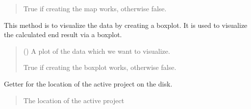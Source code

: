 \documentclass[letterpaper,10pt,english]{sphinxmanual}
\begin{document}
\begin{fulllineitems}
\begin{fulllineitems}
\begin{quote}
\begin{description}
\sphinxAtStartPar
True if creating the map works, otherwise false.

\sphinxAtStartPar
{}

\end{description}\end{quote}

\end{fulllineitems}


\begin{fulllineitems}
\label{\detokenize{apidoc/src.osm_configurator.model.application:src.osm_configurator.model.application.application.Application.create_boxplot}}
\pysigstartsignatures
{}
\pysigstopsignatures
\sphinxAtStartPar
This method is to visualize the data by creating a boxplot.
It is used to visualize the calculated end result via a boxplot.
\begin{quote}\begin{description}
\sphinxAtStartPar
{} () \textendash{} A plot of the data which we want to visualize.

\sphinxAtStartPar
True if creating the boxplot works, otherwise false.

\sphinxAtStartPar
{}

\end{description}\end{quote}

\end{fulllineitems}


\begin{fulllineitems}
\label{\detokenize{apidoc/src.osm_configurator.model.application:src.osm_configurator.model.application.application.Application.get_location}}
\pysigstartsignatures
{}
\pysigstopsignatures
\sphinxAtStartPar
Getter for the location of the active project on the disk.
\begin{quote}\begin{description}
\sphinxAtStartPar
The location of the active project


\end{description}
\end{quote}
\end{fulllineitems}
\end{fulllineitems}
\end{document}
